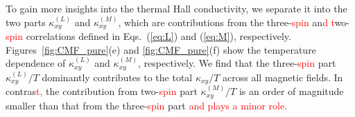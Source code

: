 \documentclass[twocolumn,superscriptaddress,showpacs, longbibliography, aps, prb]{revtex4-2}
\newcommand{\red}[1]{\textcolor{red}{#1}}
\newcommand{\blue}[1]{\textcolor{blue}{#1}}
\newcommand{\orange}[1]{\textcolor{orange}{#1}}
\begin{document}
To gain more insights %
into the thermal Hall conductivity, 
we separate it into the two parts $\kappa_{xy}^{(L)}$ and  $\kappa_{xy}^{(M)}$, which are
contributions from the three-\red{spin} %
an\red{d %
t}wo-\red{spin} %
correlations %
defined in Eqs.~(\ref{eq:L}) and (\ref{eq:M}), respectively.
Figures~\ref{fig:CMF_pure}(e) and \ref{fig:CMF_pure}(f) %
show the temperature dependence of $\kappa_{xy}^{(L)}$ and  $\kappa_{xy}^{(M)}$, respectively.
We find that the three-\red{spin} %
part $\kappa_{xy}^{(L)}/T$  dominantly
contributes
to the total $\kappa_{xy}/T$ %
across all magnetic fields.
In contras\red{t,} %
the %
contribution from two-\red{spin} %
part $\kappa_{xy}^{(M)}/T$
is an order of magnitude smaller than %
that from the three-\red{spin} %
part \red{and plays a minor role}.
\end{document}
